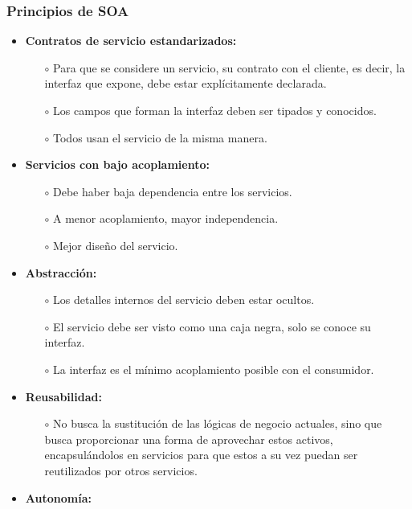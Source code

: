 \subsubsection{Principios de SOA}

\begin{itemize}
    \item \textbf{Contratos de servicio estandarizados:}
    \begin{itemize}
        \item[$\circ$] Para que se considere un servicio, su contrato con el cliente, es decir, la interfaz que expone, debe estar explícitamente declarada.
        \item[$\circ$] Los campos que forman la interfaz deben ser tipados y conocidos.
        \item[$\circ$] Todos usan el servicio de la misma manera.  
    \end{itemize}
    \item \textbf{Servicios con bajo acoplamiento:}
    \begin{itemize}
        \item[$\circ$] Debe haber baja dependencia entre los servicios.
        \item[$\circ$] A menor acoplamiento, mayor independencia.
        \item[$\circ$] Mejor diseño del servicio. 
    \end{itemize}
    \item \textbf{Abstracción:}
    \begin{itemize}
        \item[$\circ$] Los detalles internos del servicio deben estar ocultos.
        \item[$\circ$] El servicio debe ser visto como una caja negra, solo se conoce su interfaz.
        \item[$\circ$] La interfaz es el mínimo acoplamiento posible con el consumidor.
    \end{itemize}
    \item \textbf{Reusabilidad:}
    \begin{itemize}
        \item [$\circ$] No busca la sustitución de las lógicas de negocio actuales, sino que busca proporcionar una forma de aprovechar estos activos, encapsulándolos en servicios para que estos a su vez puedan ser reutilizados por otros servicios.
    \end{itemize}
    \item \textbf{Autonomía:}
    \begin{itemize}

\end{itemize}
\end{itemize}
